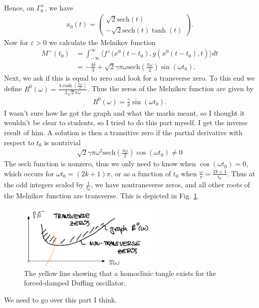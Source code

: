 \begin{ex}
\begin{align}
\end{align}
Hence, on $\Gamma_{0}^{+}$, we have 
\begin{align}
	x_0(t) = 
	\begin{pmatrix}
		\sqrt{2}  \textrm{sech}(t) \\  -\sqrt{2}  \textrm{sech} (t) \tanh(t)
	\end{pmatrix}
.	
\end{align}
Now for $\varepsilon>0$ we calculate the Melnikov function
\begin{align}
	M^{+}(t_0) &= \int_{-\infty }^{\infty }\langle f^{\perp}(x^{0}(t-t_0), g(x^{0}(t-t_0), t) \rangle dt \\
		   &= - \frac{4 \delta }{3} + \sqrt{2} \gamma \pi \omega  \textrm{sech} \left( \frac{\pi \omega }{2}\right)\sin(\omega t_0). 
\end{align}
Next, we ask if this is equal to zero and look for a transverse zero. To this end we define $R^{0}(\omega) = \frac{4 \cosh \left( \frac{\pi \omega }{2}\right)}{3 \sqrt{2} \pi \omega }$. Thus the zeros of the Melnikov function are given by
 \begin{align}
	 R^{0}(\omega) = \frac{\gamma }{\delta} \sin(\omega t_0).
\end{align}
{\color{blue} I wasn't sure how he got the graph and what the marks meant, so I thought it wouldn't be clear to students, so I tried to do this part myself. I get the inverse result of him}.
A solution is then a transitive zero if the partial derivative with respect to $t_0$ is nontrivial
\begin{align}
	\sqrt{2} \gamma \pi  \omega ^2  \textrm{sech} \left( \frac{\pi \omega }{2}\right) \cos(\omega t_0) \neq 0
\end{align}
The $ \textrm{sech} $ function is nonzero, thus we only need to know when $\cos(\omega t_0)=0$, which occurs for $\omega t_0 = (2k+1)\pi $, or as a function of $t_0$ when $\frac{\omega }{\pi } = \frac{2k+1}{t_0}$. Thus at the odd integers scaled by $\frac{1}{t_0}$, we have nontransverse zeros, and all other roots of the Melnikov function are transverse. This is depicted in Fig. \ref{fig:beam_tangle}.
\begin{figure}[h!]
	\centering
	\includegraphics[width=0.6\textwidth]{figures/ch6/15beam_tangle.png}
	\caption{The yellow line showing that a homoclinic tangle exists for the forced-damped Duffing oscillator.}
	\label{fig:beam_tangle}
\end{figure}
{\color{blue} We need to go over this part I think.}
\end{ex}

